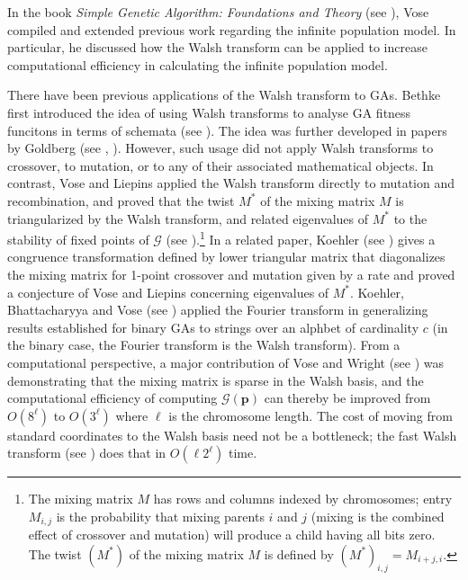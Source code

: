 
In the book \textit{Simple Genetic Algorithm: Foundations and Theory} (see \cite{Vose1999}), Vose compiled and 
extended previous work regarding the infinite population model. In particular, he discussed how 
the Walsh transform can be applied to increase 
computational efficiency in calculating the infinite population model.

There have been previous applications of the Walsh transform to GAs. Bethke first introduced the 
idea of using Walsh transforms to analyse GA fitness funcitons in terms of schemata (see \cite{Bethke1981}). 
The idea was further developed in papers by Goldberg (see \cite{Goldberg1989a}, \cite{Goldberg1989b}). 
However, such usage did not apply Walsh transforms  to crossover, to mutation, or to any of their 
associated mathematical objects. In contrast, Vose and Liepins applied the Walsh transform directly to mutation and recombination, and proved that the 
twist $M^\ast$ of the mixing matrix $M$ is triangularized by the Walsh transform, and 
related eigenvalues of $M^\ast$ to the stability of fixed points of $\mathcal{G}$ (see \cite{VoseLiepins1991}).\footnote{The mixing 
matrix $M$ has rows and columns indexed by chromosomes; entry $M_{i,j}$ is the probability 
that mixing parents $i$ and $j$ (mixing is the combined effect of crossover and mutation) will produce a 
child having all bits zero. The twist $(M^\ast)$ of the mixing matrix $M$ is defined by $(M^\ast)_{i,j} = M_{i+j, i}$.} 
In a related paper, Koehler (see \cite{Koehler1994}) gives a congruence 
transformation defined by lower triangular matrix that diagonalizes the mixing matrix for 1-point crossover and mutation 
given by a rate and proved a conjecture of Vose and Liepins concerning eigenvalues of $M^\ast$. Koehler, Bhattacharyya 
and Vose (see \cite{KoehlerBhatta1997}) applied the Fourier transform in generalizing results established 
for binary GAs to 
strings over an alphbet of cardinality $c$ (in the binary case, the Fourier transform is the Walsh transform). 
From a computational perspective, a major contribution of Vose and Wright (see \cite{VoseWright1998}) was demonstrating that 
the mixing matrix is sparse in the Walsh basis, and the computational efficiency of 
computing $\mathcal{G}(\bm{p})$ can thereby be improved from 
$O(8^\ell)$ to $O(3^\ell)$ where $\ell$ is the chromosome length. The cost of moving from standard coordinates to the Walsh basis need not be a bottleneck; 
the fast Walsh transform (see \cite{Shanks1969}) does that in $O(\ell 2^\ell)$ time.

